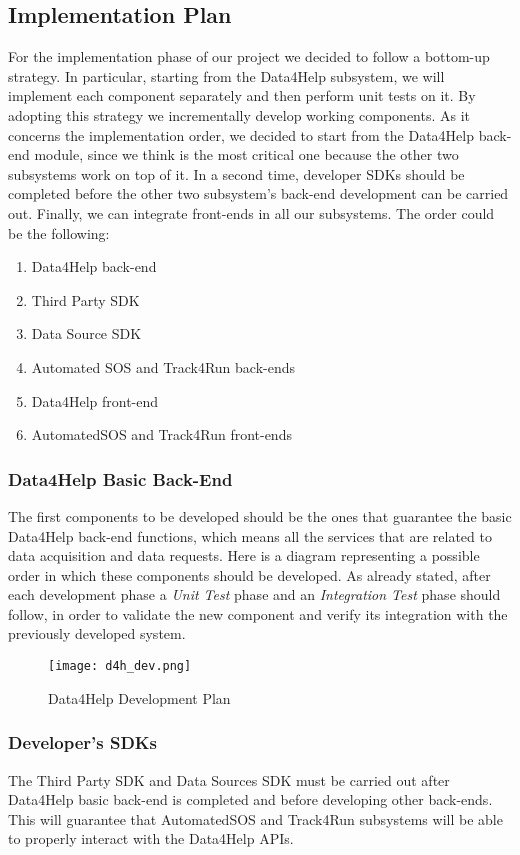\subsection{Implementation Plan}
For the implementation phase of our project we decided to follow a bottom-up strategy. In particular, starting from the Data4Help subsystem, we will implement each component separately and then perform unit tests on it. By adopting this strategy we incrementally develop working components.
As it concerns the implementation order, we decided to start from the Data4Help back-end module, since we think is the most critical one because the other two subsystems work on top of it.
In a second time, developer SDKs should be completed before the other two subsystem's back-end development can be carried out.
Finally, we can integrate front-ends in all our subsystems.
The order could be the following:

\begin{enumerate}
    \item Data4Help back-end
    \item Third Party SDK
    \item Data Source SDK
    \item Automated SOS and Track4Run back-ends
    \item Data4Help front-end
    \item AutomatedSOS and Track4Run front-ends
\end{enumerate}

\subsubsection{Data4Help Basic Back-End}
The first components to be developed should be the ones that guarantee the basic Data4Help back-end functions, which means all the services that are related to data acquisition and data requests. Here is a diagram representing a possible order in which these components should be developed. As already stated, after each development phase a \textit{Unit Test} phase and an \textit{Integration Test} phase should follow, in order to validate the new component and verify its integration with the previously developed system.

\FloatBarrier
\begin{figure}[!h]
	\centering
	\texttt{[image: d4h\_dev.png]}
	\caption{Data4Help Development Plan}
\end{figure}
\FloatBarrier

\subsubsection{Developer's SDKs}
The Third Party SDK and Data Sources SDK must be carried out after Data4Help basic back-end is completed and before developing other back-ends. This will guarantee that AutomatedSOS and Track4Run subsystems will be able to properly interact with the Data4Help APIs.

